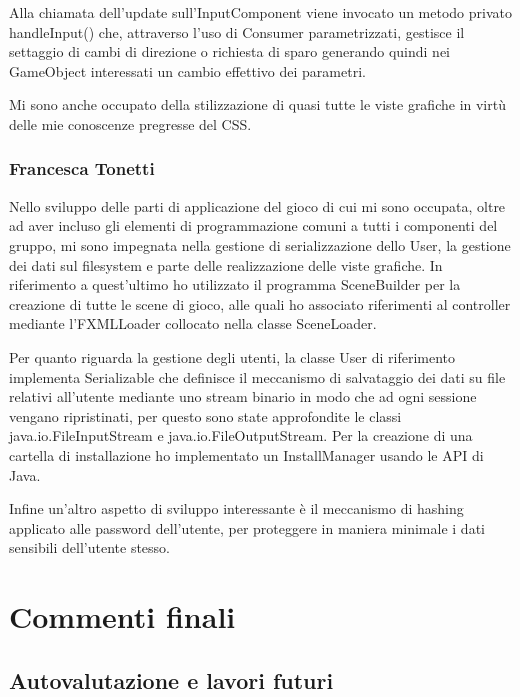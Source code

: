 \documentclass[a4paper,12pt]{report}
\begin{document}
Alla chiamata dell'update sull'InputComponent viene invocato un metodo privato handleInput() che, attraverso l'uso di Consumer parametrizzati, gestisce il settaggio di cambi di direzione o richiesta di sparo generando quindi nei GameObject interessati un cambio effettivo dei parametri.

Mi sono anche occupato della stilizzazione di quasi tutte le viste grafiche in virtù delle mie conoscenze pregresse del CSS. 



\subsection*{Francesca Tonetti}
Nello sviluppo delle parti di applicazione del gioco di cui mi sono occupata, oltre ad aver incluso gli elementi di programmazione comuni a tutti i componenti del gruppo, mi sono impegnata nella gestione di serializzazione dello User, la gestione dei dati sul filesystem e parte delle realizzazione delle viste grafiche.
In riferimento a quest'ultimo ho utilizzato il programma SceneBuilder per la creazione di tutte le scene di gioco, alle quali ho associato riferimenti al controller mediante l'FXMLLoader collocato nella classe SceneLoader.

Per quanto riguarda la gestione degli utenti, la classe User di riferimento implementa Serializable che definisce il meccanismo di salvataggio dei dati su file relativi all'utente mediante uno stream binario in modo che ad ogni sessione vengano ripristinati, per questo sono state approfondite le classi java.io.FileInputStream e java.io.FileOutputStream.
Per la creazione di una cartella di installazione ho implementato un InstallManager usando le API di Java.

Infine un'altro aspetto di sviluppo interessante è il meccanismo di hashing applicato alle password dell'utente, per proteggere in maniera minimale i dati sensibili dell'utente stesso.




\chapter{Commenti finali}

\section{Autovalutazione e lavori futuri}
\end{document}
